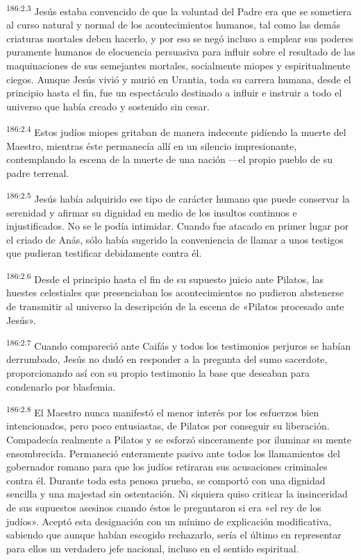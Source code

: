 \par
\textsuperscript{186:2.3} Jesús estaba convencido de que la voluntad del Padre era que se sometiera al curso natural y normal de los acontecimientos humanos, tal como las demás criaturas mortales deben hacerlo, y por eso se negó incluso a emplear sus poderes puramente humanos de elocuencia persuasiva para influir sobre el resultado de las maquinaciones de sus semejantes mortales, socialmente miopes y espiritualmente ciegos. Aunque Jesús vivió y murió en Urantia, toda su carrera humana, desde el principio hasta el fin, fue un espectáculo destinado a influir e instruir a todo el universo que había creado y sostenido sin cesar.

\par
\textsuperscript{186:2.4} Estos judíos miopes gritaban de manera indecente pidiendo la muerte del Maestro, mientras éste permanecía allí en un silencio impresionante, contemplando la escena de la muerte de una nación ---el propio pueblo de su padre terrenal.

\par
\textsuperscript{186:2.5} Jesús había adquirido ese tipo de carácter humano que puede conservar la serenidad y afirmar su dignidad en medio de los insultos continuos e injustificados. No se le podía intimidar. Cuando fue atacado en primer lugar por el criado de Anás, sólo había sugerido la conveniencia de llamar a unos testigos que pudieran testificar debidamente contra él.

\par
\textsuperscript{186:2.6} Desde el principio hasta el fin de su supuesto juicio ante Pilatos, las huestes celestiales que presenciaban los acontecimientos no pudieron abstenerse de transmitir al universo la descripción de la escena de «Pilatos procesado ante Jesús».

\par
\textsuperscript{186:2.7} Cuando compareció ante Caifás y todos los testimonios perjuros se habían derrumbado, Jesús no dudó en responder a la pregunta del sumo sacerdote, proporcionando así con su propio testimonio la base que deseaban para condenarlo por blasfemia.

\par
\textsuperscript{186:2.8} El Maestro nunca manifestó el menor interés por los esfuerzos bien intencionados, pero poco entusiastas, de Pilatos por conseguir su liberación. Compadecía realmente a Pilatos y se esforzó sinceramente por iluminar su mente ensombrecida. Permaneció enteramente pasivo ante todos los llamamientos del gobernador romano para que los judíos retiraran sus acusaciones criminales contra él. Durante toda esta penosa prueba, se comportó con una dignidad sencilla y una majestad sin ostentación. Ni siquiera quiso criticar la insinceridad de sus supuestos asesinos cuando éstos le preguntaron si era «el rey de los judíos». Aceptó esta designación con un mínimo de explicación modificativa, sabiendo que aunque habían escogido rechazarlo, sería el último en representar para ellos un verdadero jefe nacional, incluso en el sentido espiritual.

